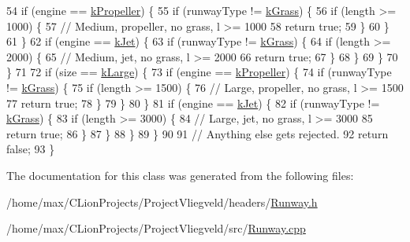 \begin{DoxyCode}
54         \textcolor{keywordflow}{if} (engine == \hyperlink{Airplane_8h_a3d2a8adb53da58e78cb0018d784e791daef171fc98c472a2acd2338353679dcc3}{kPropeller}) \{
55             \textcolor{keywordflow}{if} (runwayType != \hyperlink{Runway_8h_adbb3e23fdb96fa1bac0dbbae33431cd2ae97f33599679c1a293bb8403f4a7a8f7}{kGrass}) \{
56                 \textcolor{keywordflow}{if} (length >= 1000) \{
57                     \textcolor{comment}{// Medium, propeller, no grass, l >= 1000}
58                     \textcolor{keywordflow}{return} \textcolor{keyword}{true};
59                 \}
60             \}
61         \}
62         \textcolor{keywordflow}{if} (engine == \hyperlink{Airplane_8h_a3d2a8adb53da58e78cb0018d784e791da6262caeb7b5646a03a202006f584364c}{kJet}) \{
63             \textcolor{keywordflow}{if} (runwayType != \hyperlink{Runway_8h_adbb3e23fdb96fa1bac0dbbae33431cd2ae97f33599679c1a293bb8403f4a7a8f7}{kGrass}) \{
64                 \textcolor{keywordflow}{if} (length >= 2000) \{
65                     \textcolor{comment}{// Medium, jet, no grass, l >= 2000}
66                     \textcolor{keywordflow}{return} \textcolor{keyword}{true};
67                 \}
68             \}
69         \}
70     \}
71 
72     \textcolor{keywordflow}{if} (size == \hyperlink{Airplane_8h_a0526623f951311ba6780209b9e278dbfa6b6a05b83fa2f5308724e45442b38b7e}{kLarge}) \{
73         \textcolor{keywordflow}{if} (engine == \hyperlink{Airplane_8h_a3d2a8adb53da58e78cb0018d784e791daef171fc98c472a2acd2338353679dcc3}{kPropeller}) \{
74             \textcolor{keywordflow}{if} (runwayType != \hyperlink{Runway_8h_adbb3e23fdb96fa1bac0dbbae33431cd2ae97f33599679c1a293bb8403f4a7a8f7}{kGrass}) \{
75                 \textcolor{keywordflow}{if} (length >= 1500) \{
76                     \textcolor{comment}{// Large, propeller, no grass, l >= 1500}
77                     \textcolor{keywordflow}{return} \textcolor{keyword}{true};
78                 \}
79             \}
80         \}
81         \textcolor{keywordflow}{if} (engine == \hyperlink{Airplane_8h_a3d2a8adb53da58e78cb0018d784e791da6262caeb7b5646a03a202006f584364c}{kJet}) \{
82             \textcolor{keywordflow}{if} (runwayType != \hyperlink{Runway_8h_adbb3e23fdb96fa1bac0dbbae33431cd2ae97f33599679c1a293bb8403f4a7a8f7}{kGrass}) \{
83                 \textcolor{keywordflow}{if} (length >= 3000) \{
84                     \textcolor{comment}{// Large, jet, no grass, l >= 3000}
85                     \textcolor{keywordflow}{return} \textcolor{keyword}{true};
86                 \}
87             \}
88         \}
89     \}
90 
91     \textcolor{comment}{// Anything else gets rejected.}
92     \textcolor{keywordflow}{return} \textcolor{keyword}{false};
93 \}
\end{DoxyCode}


The documentation for this class was generated from the following files\+:\begin{DoxyCompactItemize}
\item 
/home/max/\+C\+Lion\+Projects/\+Project\+Vliegveld/headers/\hyperlink{Runway_8h}{Runway.\+h}\item 
/home/max/\+C\+Lion\+Projects/\+Project\+Vliegveld/src/\hyperlink{Runway_8cpp}{Runway.\+cpp}\end{DoxyCompactItemize}
